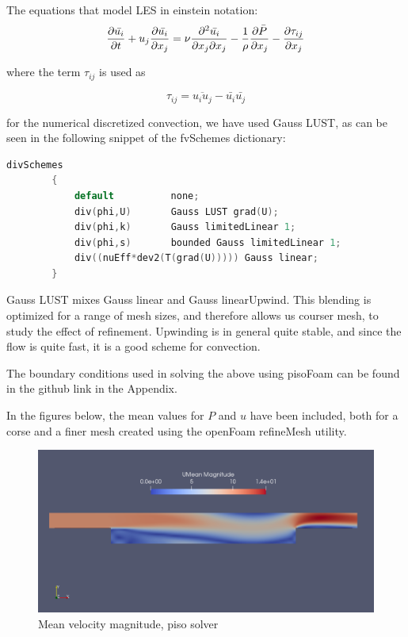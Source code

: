 \documentclass[paper=a4, fontsize=11pt]{article} %
\numberwithin{equation}{section} %
\numberwithin{figure}{section} %
\numberwithin{table}{section} %
\begin{document}
    The equations that model LES in einstein notation:
    \begin{displaymath}
        \pdv{\bar{u_i}}{t} + u_j \pdv{\bar{u_i}}{x_j} = \nu \pdv{\bar{u_i}}{x_j}{x_j} - \frac{1}{\rho} \pdv{\bar{P}}{x_j} - \pdv{\tau_{ij}}{x_j}
    \end{displaymath}

    where the term $\tau_{ij}$ is used as

    \begin{displaymath}
        \tau_{ij} = \overline{u_i u_j} - \bar{u_i} \bar{u_j}
    \end{displaymath}


    for the numerical discretized convection, we have used Gauss LUST, as can be seen in the following snippet of the fvSchemes dictionary:

    \begin{lstlisting}[language = C++, captionpos=b, caption=divergence schemes]
        divSchemes
        {
            default          none;
            div(phi,U)       Gauss LUST grad(U);
            div(phi,k)       Gauss limitedLinear 1;
            div(phi,s)       bounded Gauss limitedLinear 1;
            div((nuEff*dev2(T(grad(U))))) Gauss linear;
        }
    \end{lstlisting}


    Gauss LUST mixes Gauss linear and Gauss linearUpwind. This blending is optimized for a range of mesh sizes, and therefore allows us courser mesh, to study the effect of refinement. Upwinding is in general quite stable, and since the flow is quite fast, it is a good scheme for convection. 
    
    The boundary conditions used in solving the above using pisoFoam can be found in the github link in the Appendix.
    
    In the figures below, the mean values for $P$ and $u$ have been included, both for a corse and a finer mesh created using the openFoam refineMesh utility.
    
    \begin{figure}[h!]
        \centering
        \includegraphics[width=0.6\linewidth]{Figures/piso_U_mean}
        \caption{Mean velocity magnitude, piso solver}
        \label{fig:MeanUPiso}
    \end{figure}
\end{document}
